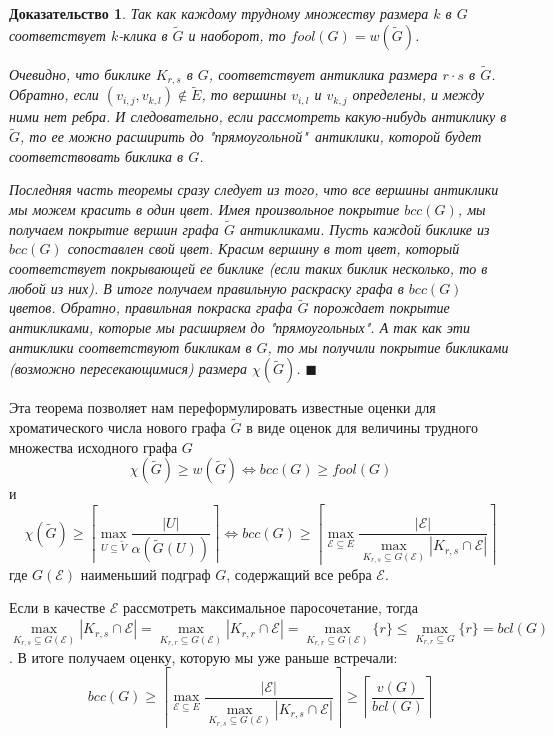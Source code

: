 \documentclass[a4paper]{article}
\newtheorem*{msolution}{Доказательство}
\begin{document}
\begin{msolution}
    Так как каждому трудному множеству размера $k$ в $G$ соответствует $k$-клика в $\widetilde{G}$ и 
    наоборот, то $fool(G) = w(\widetilde{G})$.
    
    Очевидно, что биклике $K_{r,s}$ в $G$, соответствует антиклика размера $r\cdot s$ в $\widetilde{G}$. 
    Обратно, если $(v_{i,j}, v_{k,l}) \notin \widetilde{E}$, то вершины $v_{i, l}$ и $v_{k, j}$ 
    определены, и между ними нет ребра. И следовательно, если рассмотреть какую-нибудь антиклику в 
    $\widetilde{G}$, то ее можно расширить до "прямоугольной"\  антиклики, которой будет соответствовать 
    биклика в $G$.
    
    Последняя часть теоремы сразу следует из того, что все вершины антиклики мы можем красить в один цвет. Имея 
    произвольное покрытие $bcc(G)$, мы получаем покрытие вершин графа $\widetilde{G}$ антикликами. 
    Пусть каждой биклике из $bcc(G)$ сопоставлен свой цвет. Красим вершину в тот цвет, который соответствует 
    покрывающей ее биклике (если таких биклик несколько, то в любой из них). В итоге получаем правильную 
    раскраску графа в $bcc(G)$ цветов. Обратно, правильная покраска графа $\widetilde{G}$ порождает 
    покрытие антикликами, которые мы расширяем до "прямоугольных". А так как эти антиклики
    соответствуют бикликам в $G$, то мы получили покрытие бикликами (возможно пересекающимися) 
    размера $\chi(\widetilde{G})$. $\blacksquare$
\end{msolution}

Эта теорема позволяет нам  переформулировать известные оценки для хроматического числа нового графа 
$\widetilde G$ в виде оценок для величины трудного множества исходного графа $G$
$$ \chi(\widetilde{G}) \geq w(\widetilde{G}) \Longleftrightarrow bcc(G) \geq fool(G)$$
и $$\chi(\widetilde{G}) \geq \left\lceil\max\limits_{U\subseteq \widetilde{V}}\frac{|U|}{\alpha(\widetilde{G}(U))}\right\rceil 
\Longleftrightarrow bcc(G) \geq \left\lceil\max\limits_{\mathcal{E}\subseteq E}\frac{|\mathcal{E}|}
{\max\limits_{K_{r,s}\subseteq G(\mathcal{E})}|K_{r,s}\cap\mathcal{E}|}\right\rceil$$ где $G(\mathcal{E})$ наименьший подграф $G$, 
содержащий все ребра $\mathcal{E}$. 

Если в качестве $\mathcal{E}$ рассмотреть максимальное паросочетание, тогда $\max\limits_{K_{r,s}\subseteq 
G(\mathcal{E})}|K_{r,s}\cap\mathcal{E}| = \max\limits_{K_{r,r}\subseteq G(\mathcal{E})}|K_{r,r}\cap\mathcal{E}| = 
\max\limits_{K_{r,r}\subseteq G(\mathcal{E})}\{r\} \leq \max\limits_{K_{r,r}\subseteq G}\{r\} = bcl(G)$. В итоге 
получаем оценку, которую мы уже раньше встречали: $$bcc(G) \geq \left\lceil\max\limits_{\mathcal{E}\subseteq E}\frac{|\mathcal{E}|}
{\max\limits_{K_{r,s}\subseteq G(\mathcal{E})}|K_{r,s}\cap\mathcal{E}|}\right\rceil  \geq \left\lceil\frac{v(G)}{bcl(G)}\right\rceil$$
\end{document}

